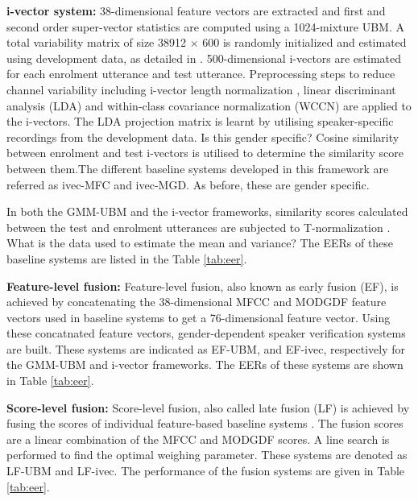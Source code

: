 \documentclass{article}
\begin{document}
\textbf{i-vector system:} 
38-dimensional feature vectors are extracted and first and second order
super-vector statistics are computed using a 1024-mixture UBM. A total
variability matrix of size 38912 $\times$ 600 is randomly initialized and
estimated using development data, as detailed in \cite{dehak_ivector,
kenny_JFA}.  500-dimensional i-vectors are estimated for each enrolment
utterance and test utterance. Preprocessing steps to reduce channel variability
including i-vector length normalization \cite{garciaRomero}, linear discriminant
analysis (LDA) and within-class covariance normalization (WCCN) are applied to
the i-vectors.  The LDA projection matrix is learnt by utilising
speaker-specific recordings from the development data. Is this gender specific?
Cosine similarity between enrolment and test i-vectors is utilised to determine
the similarity score between them.The different baseline systems developed in
this framework are referred as ivec-MFC and ivec-MGD. As before, these are
gender specific.

In both the GMM-UBM and the i-vector frameworks, similarity
scores calculated between the test and enrolment utterances 
are subjected to T-normalization \cite{tnorm}. What is the data used to estimate
the mean and variance?
The 
EERs of these baseline systems are listed in the Table \ref{tab:eer}.


\textbf{Feature-level fusion:} 
Feature-level fusion, also known as early fusion (EF),
is achieved by concatenating the 38-dimensional MFCC and MODGDF feature vectors 
used in baseline systems to get a 76-dimensional feature vector. Using these
concatnated feature vectors, gender-dependent speaker verification systems
are built. These systems are indicated as EF-UBM, and EF-ivec, respectively for
the GMM-UBM and i-vector frameworks. The EERs of these systems are shown in 
Table  \ref{tab:eer}.

\textbf{Score-level fusion:}  Score-level fusion, also called late fusion (LF)
is achieved by fusing the scores of individual feature-based baseline systems
\cite{fusion}. The fusion scores are a linear combination of the MFCC and MODGDF
scores. A line search is performed to find the optimal weighing parameter. These
systems are denoted as LF-UBM and LF-ivec.  The performance of the fusion
systems are given in Table \ref{tab:eer}. 
\end{document}
